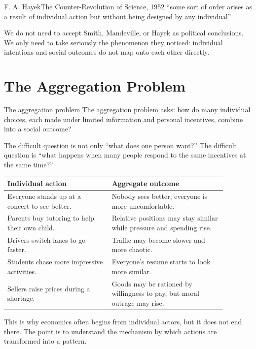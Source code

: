 \documentclass[10pt,a4paper]{article}
\begin{document}
\begin{quotebox}{F. A. Hayek}{The Counter-Revolution of Science, 1952}
``some sort of order arises as a result of individual action but without being designed by any individual''
\end{quotebox}

We do not need to accept Smith, Mandeville, or Hayek as political conclusions. We only need to take seriously the phenomenon they noticed: individual intentions and social outcomes do not map onto each other directly.

\section{The Aggregation Problem}

\begin{conceptbox}{The aggregation problem}
The aggregation problem asks: how do many individual choices, each made under limited information and personal incentives, combine into a social outcome?
\end{conceptbox}

The difficult question is not only ``what does one person want?'' The difficult question is ``what happens when many people respond to the same incentives at the same time?''

\begin{center}
\small
\begin{tabular}{p{0.42\linewidth}p{0.46\linewidth}}
\hline
\textbf{Individual action} & \textbf{Aggregate outcome} \\
\hline
Everyone stands up at a concert to see better. & Nobody sees better; everyone is more uncomfortable. \\
Parents buy tutoring to help their own child. & Relative positions may stay similar while pressure and spending rise. \\
Drivers switch lanes to go faster. & Traffic may become slower and more chaotic. \\
Students chase more impressive activities. & Everyone's resume starts to look more similar. \\
Sellers raise prices during a shortage. & Goods may be rationed by willingness to pay, but moral outrage may rise. \\
\hline
\end{tabular}
\end{center}

This is why economics often begins from individual actors, but it does not end there. The point is to understand the mechanism by which actions are transformed into a pattern.
\end{document}
